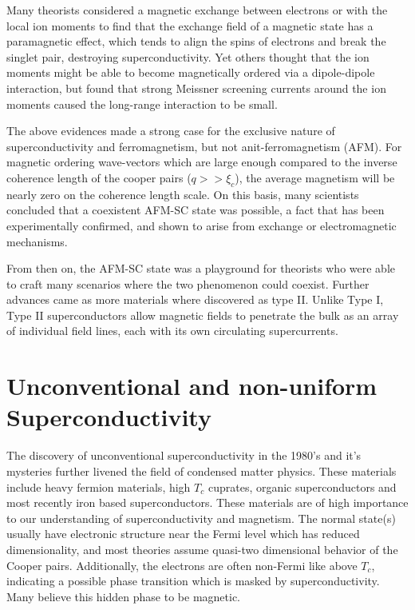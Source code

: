 Many theorists considered a magnetic exchange between electrons or with the local ion moments to find that the exchange field of a magnetic state has a paramagnetic effect, which tends to align the spins of electrons and break the singlet pair, destroying superconductivity. Yet others thought that the ion moments might be able to become magnetically ordered via a dipole-dipole interaction, but found that strong Meissner screening currents around the ion moments caused the long-range interaction to be small.

The above evidences made a strong case for the exclusive nature of superconductivity and ferromagnetism, but not anit-ferromagnetism (AFM). For magnetic ordering wave-vectors which are large enough compared to the inverse coherence length of the cooper pairs ($q>>\xi_c$), the average magnetism will be nearly zero on the coherence length scale. On this basis, many scientists concluded that a coexistent AFM-SC state was possible, a fact that has been experimentally confirmed, and shown to arise from exchange or electromagnetic mechanisms.

From then on, the AFM-SC state was a playground for theorists who were able to craft many scenarios where the two phenomenon could coexist. Further advances came as more materials where discovered as type II. Unlike Type I, Type II superconductors allow magnetic fields to penetrate the bulk as an array of individual field lines, each with its own circulating supercurrents.


\section{\label{sec:1.2}Unconventional and non-uniform Superconductivity}

The discovery of unconventional superconductivity in the 1980's and it's mysteries further livened the field of condensed matter physics. These materials include heavy fermion materials, high $T_c$ cuprates, organic superconductors and most recently iron based superconductors. These materials are of high importance to our understanding of superconductivity and magnetism. The normal state(s) usually have electronic structure near the Fermi level which has reduced dimensionality, and most theories assume quasi-two dimensional behavior of the Cooper pairs. Additionally, the electrons are often non-Fermi like above $T_c$, indicating a possible phase transition which is masked by superconductivity. Many believe this hidden phase to be magnetic.

